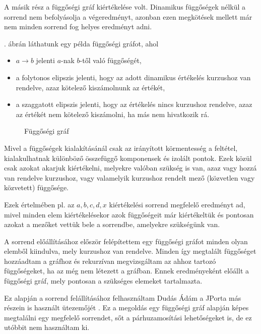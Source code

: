 A másik rész a függőségi gráf kiértékelése volt. Dinamikus függőségek nélkül a sorrend nem befolyásolja a végeredményt, azonban ezen megkötések mellett már nem minden sorrend fog helyes eredményt adni. 

. ábrán láthatunk egy példa függőségi gráfot, ahol 
\begin{itemize}
    \item $a \rightarrow b$ jelenti $a$-nak $b$-től való függőségét,
    \item a folytonos elipszis jelenti, hogy az adott dinamikus értékelés kurzushoz van rendelve, azaz kötelező kiszámolnunk az értékét,
    \item a szaggatott elipszis jelenti, hogy az értékelés nincs kurzushoz rendelve, azaz az értékét nem kötelező kiszámolni, ha más nem hivatkozik rá.
\end{itemize}

\begin{figure}[h]
    \centering
    \caption{Függőségi gráf}
    \label{fig:dependency_graph}
\end{figure}

Mivel a függőségek kialakításánál csak az irányított körmentesség a feltétel, kialakulhatnak különböző összefüggő komponensek és izolált pontok. Ezek közül csak azokat akarjuk kiértékelni, melyekre valóban szükség is van, azaz vagy hozzá van rendelve kurzushoz, vagy valamelyik kurzushoz rendelt mező (közvetlen vagy közvetett) függősége.

Ezek értelmében pl. az $a, b, c, d, x$ kiértékelési sorrend megfelelő eredményt ad, mivel minden elem kiértékelésekor azok függőségeit már kiértékeltük és pontosan azokat a mezőket vettük bele a sorrendbe, amelyekre szükségünk van.

A sorrend előállításához először felépítettem egy függőségi gráfot minden olyan elemből kiindulva, mely kurzushoz van rendelve. Minden így megtalált függőséget hozzáadtam a gráfhoz és rekurzívan megvizsgáltam az ahhoz tartozó függőségeket, ha az még nem létezett a gráfban. Ennek eredményeként előállt a függőségi gráf, mely pontosan a szükséges elemeket tartalmazta.

Ez alapján a sorrend felállításához felhasználtam Dudás Ádám a JPorta más részein is használt ütezemőjét \cite{DudiMsc}. Ez a megoldás egy függőségi gráf alapján képes megtalálni egy megfelelő sorrendet, sőt a párhuzamosítási lehetőségeket is, de ez utóbbit nem használtam ki.

